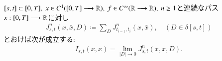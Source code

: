 	\begin{screen}
		\begin{thm}
			$[s,t] \subset [0,T],\ x \in C^1([0,T] \longrightarrow \mathbb{R}),\ f \in C^\infty(\mathbb{R} \longrightarrow \mathbb{R}),
			\ n \geq 1$と連続なパス$\bar{x}:[0,T] \longrightarrow \mathbb{R}$に対し
			\begin{align}
				J^n_{s,t}(x,\bar{x},D) \coloneqq \sum_D J^n_{t_{i-1},t_i}(x,\bar{x}),
				\quad (D \in \delta[s,t])
			\end{align}
			とおけば次が成立する:
			\begin{align}
				I_{s,t}(x,\bar{x}) = \lim_{|D| \to 0} J^n_{s,t}(x,\bar{x},D).
				\label{eq:thm_approximation_of_RS_integral_by_high_order_derivatives_1}
			\end{align}
		\end{thm}
	\end{screen}
	
